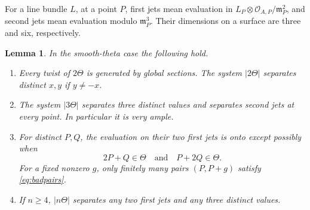 \documentclass[11pt]{article}
\newtheorem{lemma}[theorem]{Lemma}
\theoremstyle{definition}\newtheorem{definition}[theorem]{Definition}
\theoremstyle{remark}\newtheorem{remark}[theorem]{Remark}
\newcommand{\OO}{\mathcal O}
\begin{document}
For a line bundle $L$, at a point $P$, first jets mean evaluation in $L_P\otimes\OO_{A,P}/\mathfrak m_P^2$, and second jets mean evaluation modulo $\mathfrak m_P^3$. Their dimensions on a surface are three and six, respectively.

\begin{lemma}\label{lem:theta-jets}
In the smooth-theta case the following hold.
\begin{enumerate}
\item Every twist of $2\Theta$ is generated by global sections. The system $|2\Theta|$ separates distinct $x,y$ if $y\ne-x$.
\item The system $|3\Theta|$ separates three distinct values and separates second jets at every point. In particular it is very ample.
\item For distinct $P,Q$, the evaluation on their two first jets is onto except possibly when
\begin{equation}\label{eq:badpairs}
 2P+Q\in\Theta\quad\text{and}\quad P+2Q\in\Theta.
\end{equation}
For a fixed nonzero $g$, only finitely many pairs $(P,P+g)$ satisfy \eqref{eq:badpairs}.
\item If $n\ge4$, $|n\Theta|$ separates any two first jets and any three distinct values.
\end{enumerate}
\end{lemma}
\end{document}
